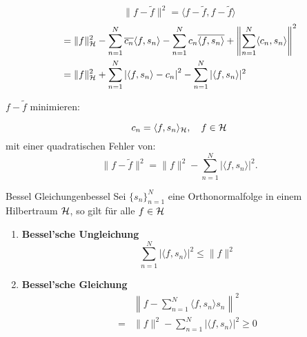 \begin{equation*}
  \|f - \tilde{f}\|^{2} = \langle f - \tilde{f}, f - \tilde{f} \rangle
\end{equation*}
\begin{align*}
  &= \|f\|_{\mathcal{H}}^{2} - \sum\limits_{n=1}^{N}\overline{c_{n}} \langle f, s_{n} \rangle - \sum\limits_{n=1}^{N}c_{n} \overline{\langle f, s_{n}\rangle}  + {\left\|\sum\limits_{n=1}^{N}\langle c_{n}, s_{n} \rangle \right\|}^{2}\\
  &= \|f\|_{\mathcal{H}}^{2} + \sum\limits_{n=1}^{N}\left|\langle f, s_{n} \rangle - c_{n}\right|^{2} - \sum\limits_{n=1}^{N}|\langle f, s_{n} \rangle |^{2}
\end{align*}

$f - \tilde{f}$ minimieren:
\begin{tcolorbox}[title={Kooeffizienten für die Approximation}, colback=white!, colframe=black!40]
\begin{equation}
  c_{n} = \langle f, s_{n} \rangle_{\mathcal{H}}, \quad f \in \mathcal{H}
\end{equation}
mit einer quadratischen Fehler von:
\begin{equation}
  \|f - \tilde{f}\|^{2} = \|f\|^{2} - \sum\limits_{n=1}^{N}|\langle f,s_{n} \rangle |^{2}.
\end{equation}
\end{tcolorbox}

\begin{mytheo}{Bessel Gleichungen}{bessel}
  Sei $\{s_{n}\}_{n=1}^{N}$ eine Orthonormalfolge in einem Hilbertraum $\mathcal{H}$, so gilt für alle $f \in \mathcal{H}$
  \begin{enumerate}
    \item \textbf{Bessel'sche Ungleichung}
          \begin{equation}
            \sum\limits_{n=1}^{N} |\langle f, s_{n} \rangle|^{2} \leq \| f \|^{2}\label{eq:besselsche_ungleichung}
          \end{equation}
          \item \textbf{Bessel'sche Gleichung}
          \begin{align}
            &\left\| f - \sum\limits_{n=1}^{N} \langle f, s_{n} \rangle  s_{n}\right\|^{2}\nonumber\\
            = &\|f\|^{2} - \sum\limits_{n=1}^{N} |\langle f, s_{n} \rangle|^{2} \geq 0\label{eq:besselsche_gleichung}
          \end{align}
  \end{enumerate}
\end{mytheo}
